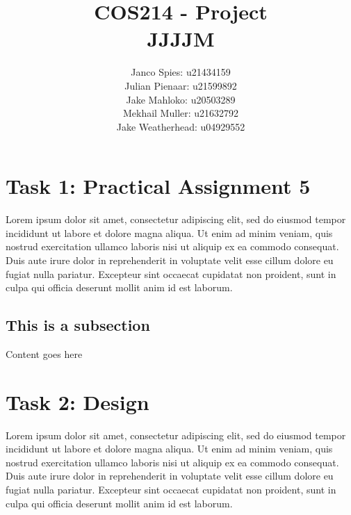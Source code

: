 \documentclass[titlepage]{article}
\title{ \Huge{\fontsize{30}{11}\selectfont COS214 - Project} \\  \LARGE{\fontsize{22}{13}\selectfont JJJJM}}
\author{%
	\fontsize{19}{13} \selectfont 
	Janco Spies: u21434159 \vspace{0.25em} \\
	\fontsize{19}{13} \selectfont 
	Julian Pienaar: u21599892 \vspace{0.25em} \\
	\fontsize{19}{13} \selectfont
	Jake Mahloko: u20503289 \vspace{0.25em} \\
	\fontsize{19}{13} \selectfont
	Mekhail Muller: u21632792 \vspace{0.25em} \\
	\fontsize{19}{13} \selectfont
	Jake Weatherhead: u04929552 \vspace{0.25em}
}
\date{}
\begin{document}
\maketitle
\pagebreak


\tableofcontents
\newpage


\section*{Task 1: Practical Assignment 5}
Lorem ipsum dolor sit amet, consectetur adipiscing elit, sed do eiusmod tempor incididunt ut labore et dolore magna aliqua. Ut enim ad minim veniam, quis nostrud exercitation ullamco laboris nisi ut aliquip ex ea commodo consequat. Duis aute irure dolor in reprehenderit in voluptate velit esse cillum dolore eu fugiat nulla pariatur. Excepteur sint occaecat cupidatat non proident, sunt in culpa qui officia deserunt mollit anim id est laborum.

\subsection*{This is a subsection}
Content goes here


\section*{Task 2: Design}
Lorem ipsum dolor sit amet, consectetur adipiscing elit, sed do eiusmod tempor incididunt ut labore et dolore magna aliqua. Ut enim ad minim veniam, quis nostrud exercitation ullamco laboris nisi ut aliquip ex ea commodo consequat. Duis aute irure dolor in reprehenderit in voluptate velit esse cillum dolore eu fugiat nulla pariatur. Excepteur sint occaecat cupidatat non proident, sunt in culpa qui officia deserunt mollit anim id est laborum.
\end{document}
